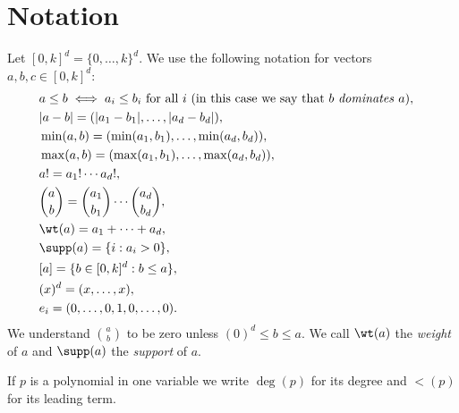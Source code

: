 \section{Notation}

Let $[0,k]^d = \{0,\dots,k\}^d$.
We use the following notation for vectors $a,b,c \in [0,k]^d$:
\begin{align*}
    &a \leq b \iff a_i \leq b_i ~ \text{for all} ~ i ~ {(\text{in this case we say that } b ~ \text{\emph{dominates}} ~ a)}, &\\
    &|a - b| = (|a_1 - b_1|, \dots, |a_d - b_d|),\\
    &\min(a, b) = (\min(a_1, b_1), \dots, \min(a_d, b_d)),\\
    &\max(a, b) = (\max(a_1, b_1), \dots, \max(a_d, b_d)),\\
    &a! = a_1! \cdots a_d!,\\
    &\binom{a}{b} = \binom{a_1}{b_1} \cdots \binom{a_d}{b_d},\\
    &\wt(a) = a_1 + \cdots + a_d, \\
    &\supp(a) = \{ i : a_i > 0\}, \\
    &[a] = \{ b \in [0,k]^d : b \leq a\}, \\
    &(x)^d = (x, \dots, x), \\
    &e_i = (0, \dots, 0, 1, 0, \dots, 0).
\end{align*}
We understand $\binom{a}{b}$ to be zero unless $(0)^d \le b \le a$.
We call $\wt(a)$ the \emph{weight} of $a$ and $\supp(a)$ the \emph{support} of $a$.

If $p$ is a polynomial in one variable we write $\deg(p)$ for its degree and $\lt(p)$ for its leading term.

